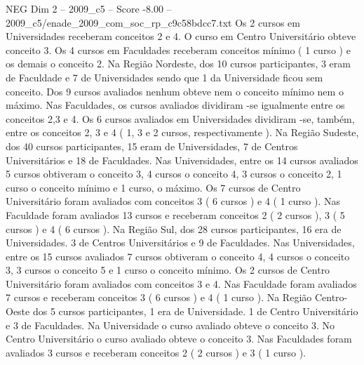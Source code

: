 \begin{textsample}{NEG Dim 2 – 2009\_c5 – Score -8.00 – 2009\_c5/enade\_2009\_com\_soc\_rp\_c9c58bdcc7.txt}
Os 2 cursos em Universidades receberam conceitos 2 e 4.
O curso em Centro Universitário obteve conceito 3.
Os 4 cursos em Faculdades receberam conceitos mínimo ( 1 curso ) e os demais o conceito 2.
Na Região Nordeste, dos 10 cursos participantes, 3 eram de Faculdade e 7 de Universidades sendo que 1 da Universidade ficou sem conceito.
Dos 9 cursos avaliados nenhum obteve nem o conceito mínimo nem o máximo.
Nas Faculdades, os cursos avaliados dividiram -se igualmente entre os conceitos 2,3 e 4.
Os 6 cursos avaliados em Universidades dividiram -se, também, entre os conceitos 2, 3 e 4 ( 1, 3 e 2 cursos, respectivamente ).
Na Região Sudeste, dos 40 cursos participantes, 15 eram de Universidades, 7 de Centros Universitários e 18 de Faculdades.
Nas Universidades, entre os 14 cursos avaliados 5 cursos obtiveram o conceito 3, 4 cursos o conceito 4, 3 cursos o conceito 2, 1 curso o conceito mínimo e 1 curso, o máximo.
Os 7 cursos de Centro Universitário foram avaliados com conceitos 3 ( 6 cursos ) e 4 ( 1 curso ).
Nas Faculdade foram avaliados 13 cursos e receberam conceitos 2 ( 2 cursos ), 3 ( 5 cursos ) e 4 ( 6 cursos ).
Na Região Sul, dos 28 cursos participantes, 16 era de Universidades. 3 de Centros Universitários e 9 de Faculdades.
Nas Universidades, entre os 15 cursos avaliados 7 cursos obtiveram o conceito 4, 4 cursos o conceito 3, 3 cursos o conceito 5 e 1 curso o conceito mínimo.
Os 2 cursos de Centro Universitário foram avaliados com conceitos 3 e 4.
Nas Faculdade foram avaliados 7 cursos e receberam conceitos 3 ( 6 cursos ) e 4 ( 1 curso ).
Na Região Centro-Oeste dos 5 cursos participantes, 1 era de Universidade. 1 de Centro Universitário e 3 de Faculdades.
Na Universidade o curso avaliado obteve o conceito 3.
No Centro Universitário o curso avaliado obteve o conceito 3.
Nas Faculdades foram avaliados 3 cursos e receberam conceitos 2 ( 2 cursos ) e 3 ( 1 curso ).

\end{textsample}
